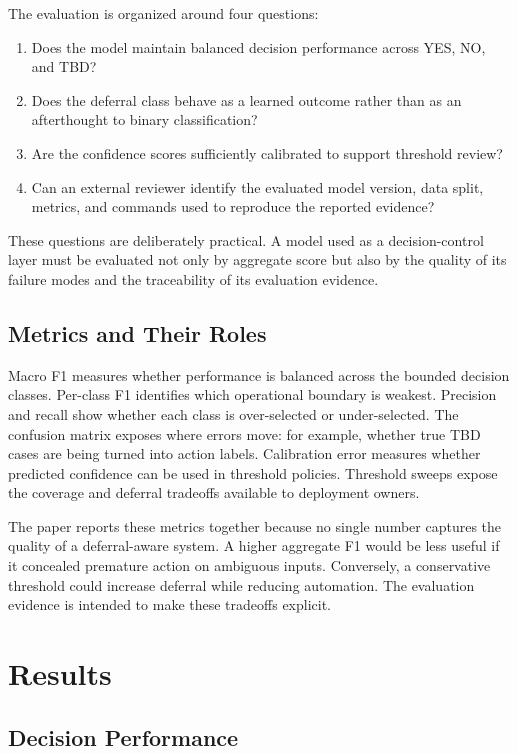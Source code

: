 \documentclass[11pt]{article}
\begin{document}
The evaluation is organized around four questions:
\begin{enumerate}[leftmargin=1.5em]
  \item Does the model maintain balanced decision performance across YES, NO, and TBD?
  \item Does the deferral class behave as a learned outcome rather than as an afterthought to binary classification?
  \item Are the confidence scores sufficiently calibrated to support threshold review?
  \item Can an external reviewer identify the evaluated model version, data split, metrics, and commands used to reproduce the reported evidence?
\end{enumerate}

These questions are deliberately practical. A model used as a decision-control layer must be evaluated not only by aggregate score but also by the quality of its failure modes and the traceability of its evaluation evidence.

\subsection{Metrics and Their Roles}

Macro F1 measures whether performance is balanced across the bounded decision classes. Per-class F1 identifies which operational boundary is weakest. Precision and recall show whether each class is over-selected or under-selected. The confusion matrix exposes where errors move: for example, whether true TBD cases are being turned into action labels. Calibration error measures whether predicted confidence can be used in threshold policies. Threshold sweeps expose the coverage and deferral tradeoffs available to deployment owners.

The paper reports these metrics together because no single number captures the quality of a deferral-aware system. A higher aggregate F1 would be less useful if it concealed premature action on ambiguous inputs. Conversely, a conservative threshold could increase deferral while reducing automation. The evaluation evidence is intended to make these tradeoffs explicit.

\section{Results}

\subsection{Decision Performance}
\end{document}
